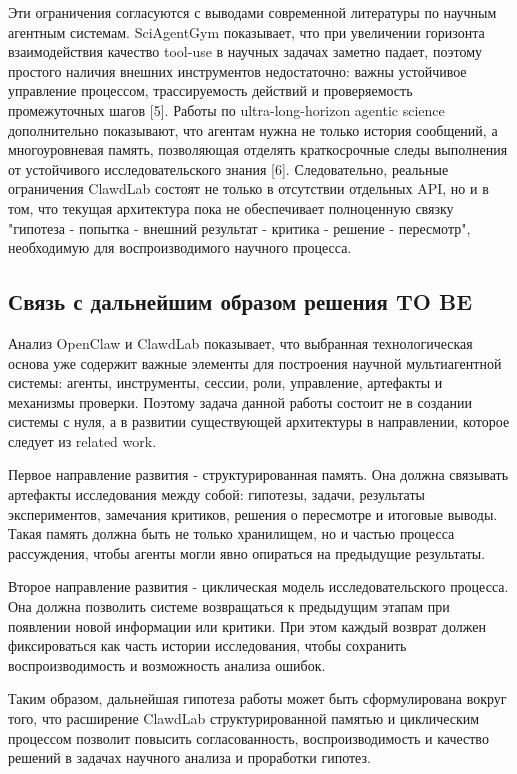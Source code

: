 Эти ограничения согласуются с выводами современной литературы по научным агентным системам. SciAgentGym показывает, что при увеличении горизонта взаимодействия качество tool-use в научных задачах заметно падает, поэтому простого наличия внешних инструментов недостаточно: важны устойчивое управление процессом, трассируемость действий и проверяемость промежуточных шагов [5]. Работы по ultra-long-horizon agentic science дополнительно показывают, что агентам нужна не только история сообщений, а многоуровневая память, позволяющая отделять краткосрочные следы выполнения от устойчивого исследовательского знания [6]. Следовательно, реальные ограничения ClawdLab состоят не только в отсутствии отдельных API, но и в том, что текущая архитектура пока не обеспечивает полноценную связку "гипотеза - попытка - внешний результат - критика - решение - пересмотр", необходимую для воспроизводимого научного процесса.



\subsection{Связь с дальнейшим образом решения TO BE}

Анализ OpenClaw и ClawdLab показывает, что выбранная технологическая основа уже содержит важные элементы для построения научной мультиагентной системы: агенты, инструменты, сессии, роли, управление, артефакты и механизмы проверки. Поэтому задача данной работы состоит не в создании системы с нуля, а в развитии существующей архитектуры в направлении, которое следует из related work.

Первое направление развития - структурированная память. Она должна связывать артефакты исследования между собой: гипотезы, задачи, результаты экспериментов, замечания критиков, решения о пересмотре и итоговые выводы. Такая память должна быть не только хранилищем, но и частью процесса рассуждения, чтобы агенты могли явно опираться на предыдущие результаты.

Второе направление развития - циклическая модель исследовательского процесса. Она должна позволить системе возвращаться к предыдущим этапам при появлении новой информации или критики. При этом каждый возврат должен фиксироваться как часть истории исследования, чтобы сохранить воспроизводимость и возможность анализа ошибок.

Таким образом, дальнейшая гипотеза работы может быть сформулирована вокруг того, что расширение ClawdLab структурированной памятью и циклическим процессом позволит повысить согласованность, воспроизводимость и качество решений в задачах научного анализа и проработки гипотез.

